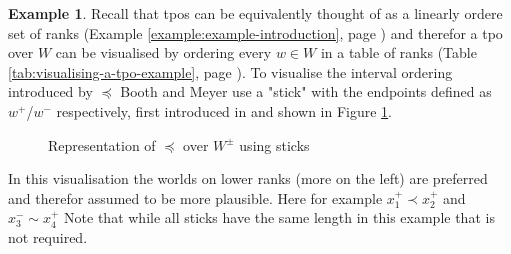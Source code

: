 \documentclass[11pt]{scrartcl}
\theoremstyle{definition}
\newtheorem{example}{Example}[section]
\theoremstyle{definition}
\begin{document}
\begin{example}
    \label{example:example-stick}
    Recall that tpos can be equivalently thought of as a linearly ordere set of ranks (Example \ref{example:example-introduction}, page \pageref{example:example-introduction}) and therefor a tpo over $W$ can be visualised by ordering every $w \in W$ in a table of ranks (Table \ref{tab:visualising-a-tpo-example}, page \pageref{tab:visualising-a-tpo-example}). To visualise the interval ordering introduced by $\preceq$ Booth and Meyer use a "stick" with the endpoints defined as $w^{+}$/$w^{-}$ respectively, first introduced in \cite{Booth2007} and shown in Figure \ref{fig:example-visualisation-scatterplot}.
        
    \begin{figure}[h]
        \centering
        \label{fig:example-visualisation-scatterplot}
            \caption{Representation of $\preceq$ over $W^{\pm}$ using sticks}
    \end{figure}
    
    In this visualisation the worlds on lower ranks (more on the left) are preferred and therefor assumed to be more plausible. Here for example $x_{1}^{+} \prec x_{2}^{+}$ and $x_{3}^{-} \sim x_{4}^{+}$ Note that while all sticks have the same length in this example that is not required.
\end{example}
\end{document}
